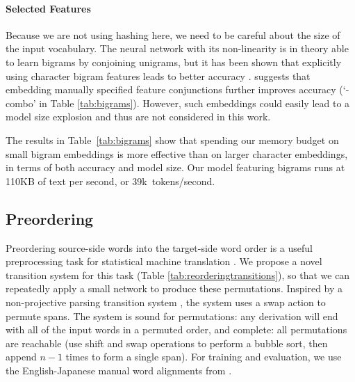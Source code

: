 \documentclass[11pt,letterpaper]{article}
\begin{document}
\begin{table}[t]
\caption{Segmentation results. Explicit bigrams are useful.}
\label{tab:bigrams}
\end{table}


\paragraph{Selected Features}
\label{sec:bigrams}
Because we are not using hashing here, we need to be careful about the size of the input vocabulary.
The neural network with its non-linearity is in theory able to learn bigrams by conjoining unigrams, 
but it has been shown that explicitly using character bigram features leads to better accuracy \cite{zhang-zhang-fu:2016:P16-1,pei-ge-chang:2014:P14-1}.
 suggests that embedding manually specified feature conjunctions further improves accuracy (`-combo' in Table \ref{tab:bigrams}).  However, such embeddings could easily lead to a model size explosion and thus are not considered in this work. 

The results in Table~\ref{tab:bigrams} show that spending our memory budget on small bigram embeddings is more effective than on larger character embeddings, in terms of both accuracy and model size.
Our model featuring bigrams runs at 110KB of text per second, or 39k~tokens/second.

\subsection{Preordering}\label{lbl:reordering-task}
Preordering source-side words into the target-side word order is a useful preprocessing task for statistical machine translation \cite{xia2004improving,collinsclause,nakagawa2015efficient,degispert-iglesias-byrne:2015:NAACL-HLT}.
We propose a novel transition system for this task (Table \ref{tab:reorderingtransitions}),
so that we can repeatedly apply a small network to produce these permutations. 
Inspired by a non-projective parsing transition system \cite{nivre:2009:ACL}, the system uses  a {\sc swap} action to permute
spans.
The system is sound for permutations: any derivation will end with all of the input words in a permuted order, and complete: all permutations are reachable (use {\sc shift} and {\sc swap} operations to perform a bubble sort, then {\sc append} $n-1$ times to form a single span).
For training and evaluation, we use the English-Japanese manual word alignments from .
\end{document}
